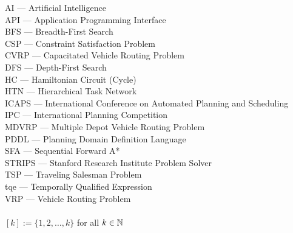 AI --- Artificial Intelligence\\
API --- Application Programming Interface\\
BFS --- Breadth-First Search\\
CSP --- Constraint Satisfaction Problem\\
CVRP --- Capacitated Vehicle Routing Problem\\
DFS --- Depth-First Search\\
HC --- Hamiltonian Circuit (Cycle)\\
HTN --- Hierarchical Task Network\\
ICAPS --- International Conference on Automated Planning and Scheduling\\
IPC --- International Planning Competition\\
MDVRP --- Multiple Depot Vehicle Routing Problem\\
PDDL --- Planning Domain Definition Language\\
SFA --- Sequential Forward A*\\
STRIPS --- Stanford Research Institute Problem Solver\\
TSP --- Traveling Salesman Problem\\
tqe --- Temporally Qualified Expression\\
VRP --- Vehicle Routing Problem\\
\\
$[k] := \{1, 2, \ldots, k\}$ for all $k \in \mathbb{N}$\\